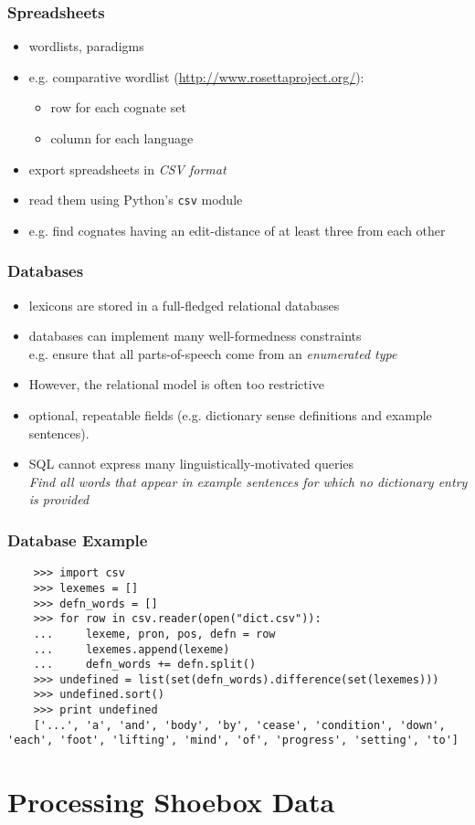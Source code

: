 \documentclass{beamer}
\begin{document}
\begin{frame}
\frametitle{Spreadsheets}
\begin{itemize}
\item wordlists, paradigms
\item e.g. comparative wordlist (\url{http://www.rosettaproject.org/}):
  \begin{itemize}
  \item row for each cognate set
  \item column for each language
  \end{itemize}
\item export spreadsheets in \textit{CSV format}
\item read them using Python's \texttt{csv} module
\item e.g. find cognates having an edit-distance of at least three from each other
\end{itemize}
\end{frame}

\begin{frame}
\frametitle{Databases}
\begin{itemize}
  \item lexicons are stored in a full-fledged relational databases
  \item databases can implement many well-formedness constraints\\
    e.g. ensure that all parts-of-speech come from an
    \textit{enumerated type}
  \item However, the relational model is often too restrictive
  \item optional, repeatable fields (e.g.
    dictionary sense definitions and example sentences).
  \item SQL cannot express many linguistically-motivated queries\\
    \textit{Find all words that appear in example sentences for which no dictionary entry is provided}
\end{itemize}
\end{frame}

\begin{frame}[fragile]
\frametitle{Database Example}  

\begin{verbatim}
    >>> import csv
    >>> lexemes = []
    >>> defn_words = []
    >>> for row in csv.reader(open("dict.csv")):
    ...     lexeme, pron, pos, defn = row
    ...     lexemes.append(lexeme)
    ...     defn_words += defn.split()
    >>> undefined = list(set(defn_words).difference(set(lexemes)))
    >>> undefined.sort()
    >>> print undefined
    ['...', 'a', 'and', 'body', 'by', 'cease', 'condition', 'down', 'each', 'foot', 'lifting', 'mind', 'of', 'progress', 'setting', 'to']
\end{verbatim}
\end{frame}

\section{Processing Shoebox Data}
\end{document}
